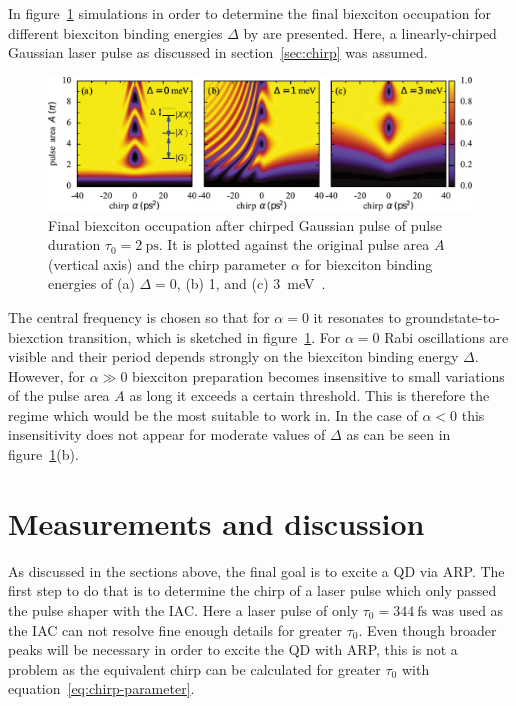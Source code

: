 In figure~\ref{fig:biexciton-occupation} simulations in order to determine the final biexciton occupation for different biexciton binding energies $\Delta$ by \textcite{glassl_biexciton_2013} are presented.
Here, a linearly-chirped Gaussian laser pulse as discussed in section~\ref{sec:chirp} was assumed.
\begin{figure}[H]
	\centering
	\includegraphics[width=\linewidth]{figures/chirp/biexciton-occupation}
	\caption[Final biexciton occupation after chirped Gaussian pulse of pulse duration $\tau_0 = \SI{2}{\pico \second}$]{Final biexciton occupation after chirped Gaussian pulse of pulse duration $\tau_0 = \SI{2}{\pico \second}$.
		It is plotted against the original pulse area $A$ (vertical axis) and the chirp parameter $\alpha$ for biexciton binding energies of (a) $\Delta=0$, (b) 1, and (c) \SI{3}{\milli \electronvolt}~\cite{glassl_biexciton_2013}.}
	\label{fig:biexciton-occupation}
\end{figure}
The central frequency is chosen so that for $\alpha=0$ it resonates to groundstate-to-biexction transition, which is sketched in figure~\ref{fig:biexciton-occupation}.
For $\alpha=0$ Rabi oscillations are visible and their period depends strongly on the biexciton binding energy $\Delta$.
However, for $\alpha \gg 0$ biexciton preparation becomes insensitive to small variations of the pulse area $A$ as long it exceeds a certain threshold.
This is therefore the regime which would be the most suitable to work in.
In the case of $\alpha < 0$ this insensitivity does not appear for moderate values of $\Delta$ as can be seen in figure~\ref{fig:biexciton-occupation}(b).

\newpage
\section{Measurements and discussion}
As discussed in the sections above, the final goal is to excite a \ac{QD} via \ac{ARP}.
The first step to do that is to determine the chirp of a laser pulse which only passed the pulse shaper with the \ac{IAC}.
Here a laser pulse of only $\tau_0=\SI{344}{\femto \second}$ was used as the \ac{IAC} can not resolve fine enough details for greater $\tau_0$.
Even though broader peaks will be necessary in order to excite the \ac{QD} with \ac{ARP}, this is not a problem as the equivalent chirp can be calculated for greater $\tau_0$ with equation~\eqref{eq:chirp-parameter}.

